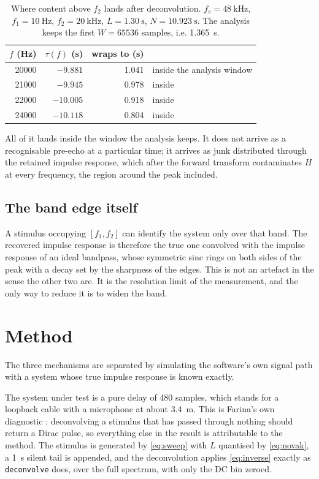 \documentclass[11pt,a4paper]{article}
\newcommand{\code}[1]{\texttt{\small #1}}
\begin{document}
\begin{table}[h]
\centering
\caption{Where content above $f_2$ lands after deconvolution.
$f_s = \SI{48}{\kilo\hertz}$, $f_1 = \SI{10}{\hertz}$,
$f_2 = \SI{20}{\kilo\hertz}$, $L = \SI{1.30}{\second}$,
$N = \SI{10.923}{\second}$. The analysis keeps the first
$W = \num{65536}$ samples, i.e. \SI{1.365}{\second}.}
\label{tab:wrap}
\begin{tabular}{rrrl}
\toprule
$f$ (Hz) & $\tau(f)$ (s) & wraps to (s) & \\
\midrule
20000 & $-9.881$ & 1.041 & inside the analysis window \\
21000 & $-9.945$ & 0.978 & inside \\
22000 & $-10.005$ & 0.918 & inside \\
24000 & $-10.118$ & 0.804 & inside \\
\bottomrule
\end{tabular}
\end{table}

All of it lands inside the window the analysis keeps. It does not arrive as a
recognisable pre-echo at a particular time; it arrives as junk distributed
through the retained impulse response, which after the forward transform
contaminates $H$ at every frequency, the region around the peak included.

\subsection{The band edge itself}

A stimulus occupying $[f_1, f_2]$ can identify the system only over that band.
The recovered impulse response is therefore the true one convolved with the
impulse response of an ideal bandpass, whose symmetric sinc rings on both sides
of the peak with a decay set by the sharpness of the edges. This is not an
artefact in the sense the other two are. It is the resolution limit of the
measurement, and the only way to reduce it is to widen the band.

\section{Method}
\label{sec:method}

The three mechanisms are separated by simulating the software's own signal path
with a system whose true impulse response is known exactly.

The system under test is a pure delay of \num{480} samples, which stands for a
loopback cable with a microphone at about \SI{3.4}{\metre}. This is Farina's own
diagnostic \cite{Farina2007}: deconvolving a stimulus that has passed through
nothing should return a Dirac pulse, so everything else in the result is
attributable to the method. The stimulus is generated by \eqref{eq:sweep} with
$L$ quantised by \eqref{eq:novak}, a \SI{1}{\second} silent tail is appended,
and the deconvolution applies \eqref{eq:inverse} exactly as
\code{deconvolve} does, over the full spectrum, with only the DC bin zeroed.
\end{document}
